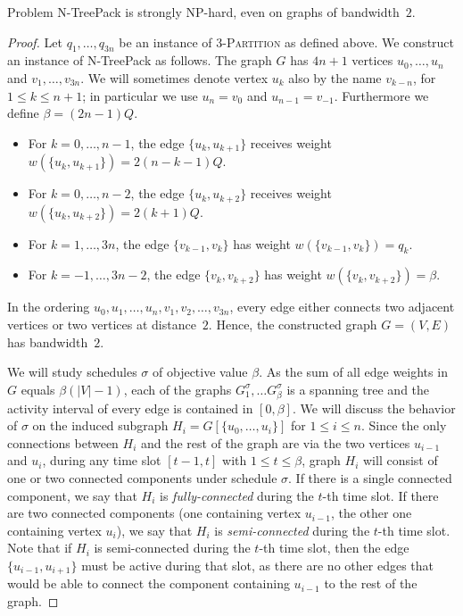 \documentclass[runningheads]{llncs}
\newcommand{\set}[1]{\{ #1 \}}
\newcommand{\fromto}[2]{\set{#1, \ldots, #2}}
\newcommand{\xxxNTP}{{\sc N-TreePack}}
\begin{document}
\begin{theorem}
\label{thm:hardness_bandwidth}
Problem {\xxxNTP} is strongly NP-hard, even on graphs of bandwidth~$2$.
\end{theorem}
\begin{proof}
Let $q_1,\ldots,q_{3n}$ be an instance of \textsc{3-Partition} as defined above.
We construct an instance of {\xxxNTP} as follows.
The graph $G$ has $4n+1$ vertices $u_0,\ldots,u_n$ and $v_1,\ldots,v_{3n}$.
We will sometimes denote vertex $u_k$ also by the name $v_{k-n}$, for $1\le k\le n+1$;
in particular we use $u_n=v_0$ and $u_{n-1}=v_{-1}$.
Furthermore we define $\beta=(2n-1)Q$.
\begin{itemize}
\item 
For $k=0,\ldots,n-1$,   the edge $\{u_k, u_{k+1}\}$ receives weight $w(\{u_k, u_{k+1}\}) = 2(n-k-1)Q$.
\item
For $k=0,\ldots,n-2$,   the edge $\{u_k, u_{k+2}\}$ receives weight $w(\{u_k, u_{k+2}\})=2(k+1)Q$.
\item 
For $k=1,\ldots,3n$,    the edge $\{v_{k-1}, v_k\}$ has weight $w(\{v_{k-1}, v_k\})=q_k$.
\item
For $k=-1,\ldots,3n-2$, the edge $\{v_k, v_{k+2}\}$ has weight $w(\{v_k, v_{k+2}\})=\beta$.  
\end{itemize}
In the ordering $u_0,u_1,\ldots,u_n,v_1,v_2,\ldots,v_{3n}$, every edge either connects two adjacent 
vertices or two vertices at distance~$2$. Hence, the constructed graph $G=(V,E)$ has bandwidth~$2$. 

We will study schedules $\sigma$ of objective value $\beta$. 
As the sum of all edge weights in $G$ equals $\beta(|V|-1)$, each of the graphs 
$G^\sigma_1, \dots G^\sigma_\beta$ is a spanning tree and the activity interval of every edge is contained in $[0, \beta]$.
We will discuss the behavior of $\sigma$ on the induced subgraph $H_i = G[\fromto{u_0}{u_i}]$ for $1\le i\le n$.
Since the only connections between $H_i$ and the rest of the graph are via the two vertices $u_{i-1}$ and $u_i$,
during any time slot $[t-1,t]$ with $1\le t\le\beta$, graph $H_i$ will consist of one or two connected components
under schedule $\sigma$.
If there is a single connected component, we say that $H_i$ is \emph{fully-connected} during the $t$-th time slot.
If there are two connected components (one containing vertex $u_{i-1}$, the other one containing 
vertex $u_i$), we say that $H_i$ is \emph{semi-connected} during the $t$-th time slot.
Note that if $H_i$ is semi-connected during the $t$-th time slot, then the edge $\{u_{i-1}, u_{i+1}\}$ must be 
active during that slot, as there are no other edges that would be able to connect the component containing 
$u_{i-1}$ to the rest of the graph.


\end{proof}
\end{document}
